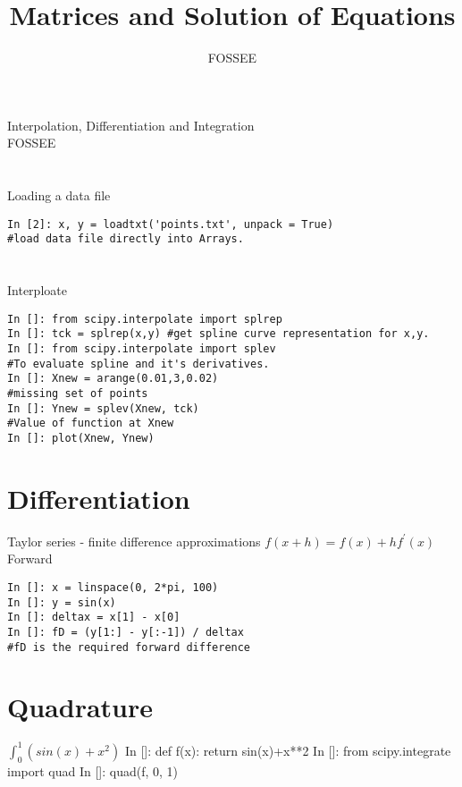 \documentclass[12pt]{article}
\title{Matrices and Solution of Equations}
\author{FOSSEE}
\begin{document}
\date{}
\vspace{-1in}
\begin{center}
\LARGE{Interpolation, Differentiation and Integration}\\
\large{FOSSEE}
\end{center}
\section{}
Loading a data file
\begin{verbatim}
In [2]: x, y = loadtxt('points.txt', unpack = True)
#load data file directly into Arrays.
\end{verbatim}
\section{}
Interploate
\begin{verbatim}
In []: from scipy.interpolate import splrep
In []: tck = splrep(x,y) #get spline curve representation for x,y.
In []: from scipy.interpolate import splev
#To evaluate spline and it's derivatives.
In []: Xnew = arange(0.01,3,0.02)
#missing set of points
In []: Ynew = splev(Xnew, tck)
#Value of function at Xnew
In []: plot(Xnew, Ynew)
\end{verbatim}

\section{Differentiation}
Taylor series - finite difference approximations
$f(x+h)=f(x)+hf^{'}(x)$ Forward
\begin{verbatim}
In []: x = linspace(0, 2*pi, 100)
In []: y = sin(x)
In []: deltax = x[1] - x[0]
In []: fD = (y[1:] - y[:-1]) / deltax 
#fD is the required forward difference
\end{verbatim}

\section{Quadrature}
$\int_0^1(sin(x) + x^2)$ 
In []: def f(x):
           return sin(x)+x**2
In []: from scipy.integrate import quad
In []: quad(f, 0, 1)
\end{document}
